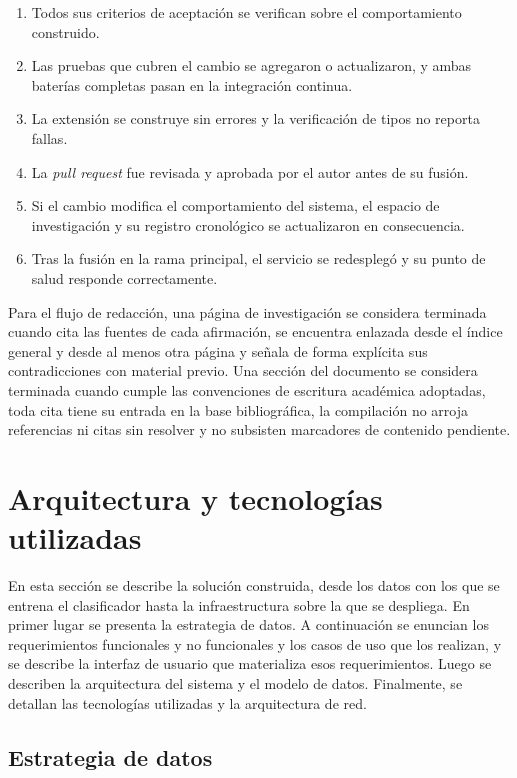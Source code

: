 \begin{enumerate}
  \item Todos sus criterios de aceptación se verifican sobre el comportamiento construido.
  \item Las pruebas que cubren el cambio se agregaron o actualizaron, y ambas baterías completas pasan en la integración continua.
  \item La extensión se construye sin errores y la verificación de tipos no reporta fallas.
  \item La \textit{pull request} fue revisada y aprobada por el autor antes de su fusión.
  \item Si el cambio modifica el comportamiento del sistema, el espacio de investigación y su registro cronológico se actualizaron en consecuencia.
  \item Tras la fusión en la rama principal, el servicio se redesplegó y su punto de salud responde correctamente.
\end{enumerate}

Para el flujo de redacción, una página de investigación se considera terminada cuando cita las fuentes de cada afirmación, se encuentra enlazada desde el índice general y desde al menos otra página y señala de forma explícita sus contradicciones con material previo. Una sección del documento se considera terminada cuando cumple las convenciones de escritura académica adoptadas, toda cita tiene su entrada en la base bibliográfica, la compilación no arroja referencias ni citas sin resolver y no subsisten marcadores de contenido pendiente.

\section{Arquitectura y tecnologías utilizadas}
\label{sec:arq-tec}

En esta sección se describe la solución construida, desde los datos con los que se entrena el clasificador hasta la infraestructura sobre la que se despliega. En primer lugar se presenta la estrategia de datos. A continuación se enuncian los requerimientos funcionales y no funcionales y los casos de uso que los realizan, y se describe la interfaz de usuario que materializa esos requerimientos. Luego se describen la arquitectura del sistema y el modelo de datos. Finalmente, se detallan las tecnologías utilizadas y la arquitectura de red.

\subsection{Estrategia de datos}
\label{sec:datos}

